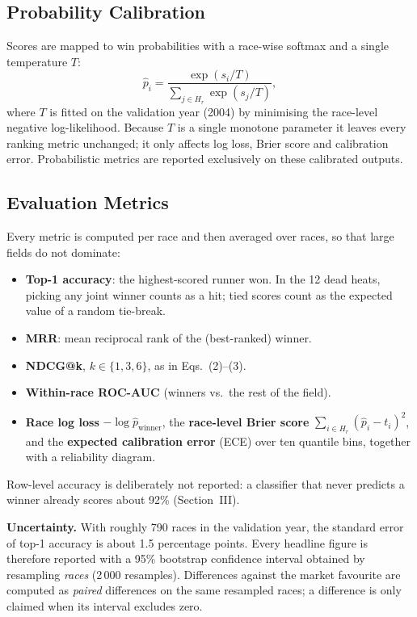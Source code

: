 \subsection{Probability Calibration}

Scores are mapped to win probabilities with a race-wise softmax and a single
temperature $T$:
\begin{equation}
  \hat p_i = \frac{\exp(s_i/T)}{\sum_{j\in H_r}\exp(s_j/T)},
\end{equation}
where $T$ is fitted on the validation year (2004) by minimising the race-level
negative log-likelihood. Because $T$ is a single monotone parameter it leaves
every ranking metric unchanged; it only affects log loss, Brier score and
calibration error. Probabilistic metrics are reported exclusively on these
calibrated outputs.

\subsection{Evaluation Metrics}

Every metric is computed per race and then averaged over races, so that large
fields do not dominate:

\begin{itemize}
  \item \textbf{Top-1 accuracy}: the highest-scored runner won. In the 12 dead
        heats, picking any joint winner counts as a hit; tied scores count as
        the expected value of a random tie-break.
  \item \textbf{MRR}: mean reciprocal rank of the (best-ranked) winner.
  \item \textbf{NDCG@k}, $k\in\{1,3,6\}$, as in Eqs.~(2)--(3).
  \item \textbf{Within-race ROC-AUC} (winners vs.\ the rest of the field).
  \item \textbf{Race log loss} $-\log \hat p_{\text{winner}}$, the
        \textbf{race-level Brier score}
        $\sum_{i\in H_r}(\hat p_i - t_i)^2$, and the \textbf{expected
        calibration error} (ECE) over ten quantile bins, together with a
        reliability diagram.
\end{itemize}

Row-level accuracy is deliberately not reported: a classifier that never
predicts a winner already scores about 92\% (Section~III).

\textbf{Uncertainty.} With roughly 790 races in the validation year, the
standard error of top-1 accuracy is about 1.5 percentage points. Every
headline figure is therefore reported with a 95\% bootstrap confidence
interval obtained by resampling \emph{races} (2\,000 resamples). Differences
against the market favourite are computed as \emph{paired} differences on the
same resampled races; a difference is only claimed when its interval excludes
zero.

